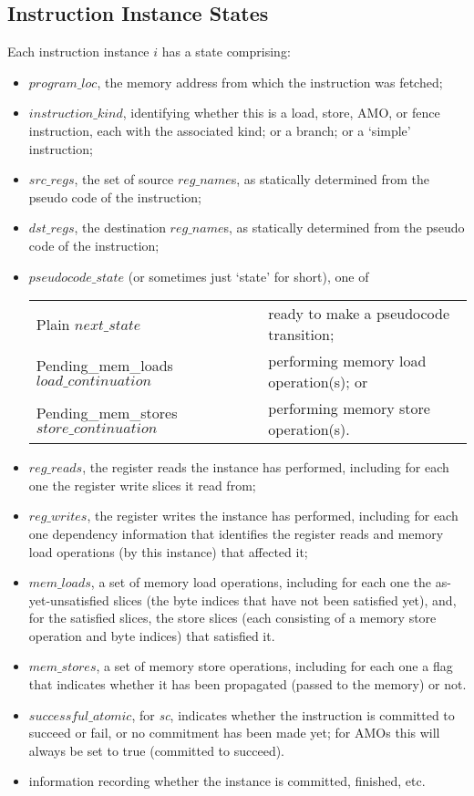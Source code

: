 \subsection{Instruction Instance States}\label{sec:omm:inst_state}
Each instruction instance $i$ has a state comprising:
\begin{itemize}
\item $program\_loc$, the memory address from which the instruction was fetched;
\item $instruction\_kind$, identifying whether this is a load, store, AMO, or fence instruction, each with the associated kind; or a branch; or a `simple' instruction;
\item $src\_regs$, the set of source $reg\_name$s, as statically determined from the pseudo code of the instruction;
\item $dst\_regs$, the destination $reg\_name$s, as statically determined from the pseudo code of the instruction;
\item $pseudocode\_state$ (or sometimes just `state' for short), one of
  \begin{center}
  \begin{tabular}{l@{ - }l}
  {\sc Plain} $next\_state$                        & ready to make a pseudocode transition; \\
  {\sc Pending\_mem\_loads} $load\_continuation$   & performing memory load operation(s); or \\
  {\sc Pending\_mem\_stores} $store\_continuation$ & performing memory store operation(s). \\
  \end{tabular}
  \end{center}
\item $reg\_reads$, the register reads the instance has performed, including for each one the register write slices it read from;
\item $reg\_writes$, the register writes the instance has performed, including for each one dependency information that identifies the register reads and memory load operations (by this instance) that affected it;
\item $mem\_loads$, a set of memory load operations, including for each one the as-yet-unsatisfied slices (the byte indices that have not been satisfied yet), and, for the satisfied slices, the store slices (each consisting of a memory store operation and byte indices) that satisfied it.
\item $mem\_stores$, a set of memory store operations, including for each one a flag that indicates whether it has been propagated (passed to the memory) or not.
\item $successful\_atomic$, for {\em sc}, indicates whether the instruction is committed to succeed or fail, or no commitment has been made yet; for AMOs this will always be set to true (committed to succeed).
\item information recording whether the instance is committed, finished, etc.
\end{itemize}

